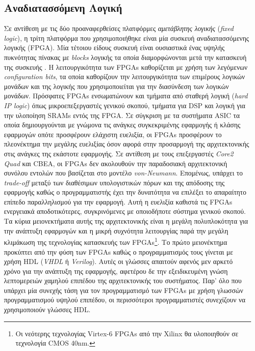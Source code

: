 \subsection[6.1.3 Αναδιατασσόμενη Λογική]{Αναδιατασσόμενη Λογική}
\label{subsection:sub613}
\indent
Σε αντίθεση με τις δύο προαναφερθείσες πλατφόρμες \textsl{αμετάβλητης λογικής} (\textsl{fixed logic}), η τρίτη πλατφόρμα που χρησιμοποιήθηκε είναι μία συσκευή αναδιατασσόμενης λογικής (\ac{FPGA}). Μία τέτοιου είδους συσκευή είναι ουσιαστικά ένας υψηλής πυκνότητας πίνακας με \textsl{blocks} λογικής τα οποία διαμορφώνονται μετά την κατασκευή της συσκευής \cite{ComptonSurvey}. Η λειτουργικότητα των \acp{FPGA} καθορίζεται με χρήση των λεγόμενων \textsl{configuration bits}, τα οποία καθορίζουν την λειτουργικότητα των επιμέρους λογικών μονάδων και της λογικής που χρησιμοποιείται για την διασύνδεση των λογικών μονάδων. Πρόσφατες \acp{FPGA} ενσωματώνουν και τμήματα από σταθερή λογική (\textsl{hard IP logic}) όπως μικροεπεξεργαστές γενικού σκοπού, τμήματα για \ac{DSP} και λογική για την υλοποίηση \ac{SRAMs} εντός της \ac{FPGA}.\newline \indent
Σε σύγκριση με τα συστήματα \ac{ASIC} τα οποία δημιουργούνται με γνώμονα τις ανάγκες συγκεκριμένης εφαρμογής ή κλάσης εφαρμογών οπότε προσφέρουν ελάχιστη ευελιξία, οι \acp{FPGA} προσφέρουν το πλεονέκτημα την μεγάλης ευελιξίας όσον αφορά στην προσαρμογή της αρχιτεκτονικής στις ανάγκες της εκάστοτε εφαρμογής. Σε αντίθεση με τους επεξεργαστές \textsl{Core2 Quad} και \ac{CBEA}, οι \acp{FPGA} δεν ακολουθούν την παραδοσιακή αρχιτεκτονική συνόλου εντολών που βασίζεται στο μοντέλο \textsl{von-Neumann}. Επομένως, υπάρχει το \textsl{trade-off} μεταξύ των διαθέσιμων υπολογιστικών πόρων και της απόδοσης της εφαρμογής καθώς ο προγραμματιστής έχει την δυνατότητα να επιλέξει το απαραίτητο επίπεδο παραλληλισμού για την εφαρμογή. Αυτή η ευελιξία καθιστά τις \acp{FPGA} ενεργειακά αποδοτικότερες, συγκρινόμενες με οποιοδήποτε σύστημα γενικού σκοπού.\newline \indent
Τα κύρια μειονεκτήματα αυτής της αρχιτεκτονικής είναι η μεγάλη πολυπλοκότητα για την ανάπτυξη εφαρμογών και η μικρή συχνότητα λειτουργίας παρά την μεγάλη κλιμάκωση της τεχνολογίας κατασκευής των \acp{FPGA}\footnote{\small Οι νεότερης τεχνολογίας Virtex-6 \acp{FPGA} από την Xilinx θα υλοποιηθούν σε τεχνολογία CMOS 40nm.}. Το πρώτο μειονέκτημα προκύπτει από την φύση των \acp{FPGA} καθώς ο προγραμματισμός τους γίνεται με χρήση \ac{HDL} (\textsl{VHDL} ή \textsl{Verilog}). Αυτές οι γλώσσες απαιτούν αφενός μεν αρκετό χρόνο για την ανάπτυξη της εφαρμογής, αφετέρου δε την εξειδικευμένη γνώση λεπτομερειών χαμηλού επιπέδου της αρχιτεκτονικής του συστήματος. Παρ' όλο που υπάρχει μία συνεχής τάση για τον προγραμματισμό των \acp{FPGA} με χρήση γλωσσών προγραμματισμού υψηλού επιπέδου, οι περισσότεροι προγραμματιστές συνεχίζουν να χρησιμοποιούν γλώσσες \ac{HDL}.\newline \indent 
